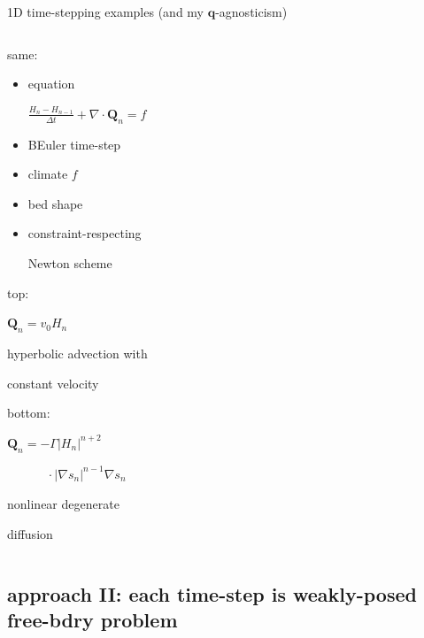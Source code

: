\documentclass{beamer}
\newcommand\bq{\mathbf{q}}
\newcommand\bQ{\mathbf{Q}}
\newcommand{\Div}{\nabla\cdot}
\newcommand{\grad}{\nabla}
\begin{document}
\begin{frame}{1D time-stepping examples (and my $\bq$-agnosticism)}

\begin{columns}
\begin{column}{0.35\textwidth}
\alert{same:}

\begin{itemize}
\scriptsize
\item equation

\tiny
\hspace{-10mm} $\frac{H_n-H_{n-1}}{\Delta t} + \Div\bQ_n = f$
\scriptsize

\item BEuler time-step
\item climate $f$
\item bed shape
\item constraint-respecting

Newton scheme
\end{itemize}

\vspace{2mm}

\alert{top:}

\scriptsize

\medskip
$\bQ_n = v_0 H_n$

hyperbolic advection with

constant velocity

\vspace{5mm}

\normalsize 

\alert{bottom:}

\scriptsize

\medskip
$\bQ_n = - \Gamma |H_n|^{n+2}$

$\phantom{bQ_n = }\, \cdot |\grad s_n|^{n-1} \grad s_n$

nonlinear degenerate

diffusion
\end{column}
\begin{column}{0.55\textwidth}
\hspace{-15mm}

\medskip
\hspace{-15mm}
\end{column}
\end{columns}
\end{frame}


\subsection{approach II: each time-step is weakly-posed free-bdry problem}
\end{document}

